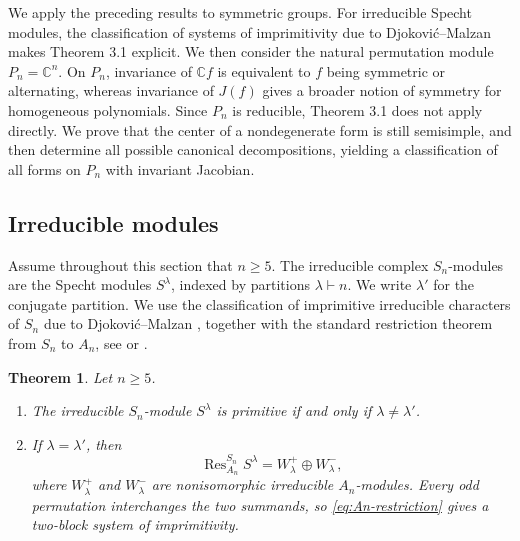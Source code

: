 \documentclass[11pt,reqno]{amsart}
\numberwithin{equation}{section}
\newtheorem{theorem}{Theorem}[section]
\theoremstyle{definition}
\theoremstyle{remark}
\newtheorem{remark}[theorem]{Remark}
\newcommand{\C}{\mathbb C}
\newcommand{\Res}{\operatorname{Res}}
\begin{document}
We apply the preceding results to symmetric groups. For irreducible Specht modules, the classification of systems of imprimitivity due to Djoković--Malzan  \cite{DjokovicMalzan} makes Theorem 3.1 explicit. We then consider the natural permutation module \(P_n=\mathbb C^n\).  On $P_n$, invariance of $\C f$ is
equivalent to $f$ being symmetric or alternating, whereas  invariance
of $J(f)$  gives a broader notion of
symmetry for homogeneous polynomials. Since \(P_n\) is reducible, Theorem 3.1 does not apply directly. We prove that the center of a nondegenerate form is still semisimple, and then determine all possible canonical decompositions, yielding a
classification of all forms on $P_n$ with invariant Jacobian.

\subsection{Irreducible modules}

Assume throughout this section that $n\geq5$.  The irreducible
complex $S_n$-modules are the Specht modules $S^\lambda$, indexed by
partitions $\lambda\vdash n$.  We write $\lambda'$ for the conjugate
partition.   We use the classification of imprimitive irreducible characters of
$S_n$ due to Djokovi\'c--Malzan
\cite[Theorem~1]{DjokovicMalzan}, together with the standard
restriction theorem from $S_n$ to $A_n$,  see \cite[Theorem~2.5.7]{JamesKerber} or  \cite[Section~5.1]{FultonHarris}.

\begin{theorem}\label{thm:DM}
Let $n\geq5$. 
\begin{enumerate}[label=\textup{(\roman*)},leftmargin=0.9cm]
\item The irreducible $S_n$-module $S^\lambda$ is primitive
if and only if $\lambda\ne\lambda'$. 
\smallskip

\item If $\lambda=\lambda'$, then
\begin{equation}\label{eq:An-restriction}
  \Res_{A_n}^{S_n}S^\lambda
  =
  W_\lambda^+\oplus W_\lambda^-,
\end{equation}
where $W_\lambda^+$ and $W_\lambda^-$ are nonisomorphic irreducible
$A_n$-modules.  Every odd permutation interchanges the two summands,
so \eqref{eq:An-restriction} gives a two-block system of imprimitivity.
\end{enumerate}
\end{theorem}

\end{document}
